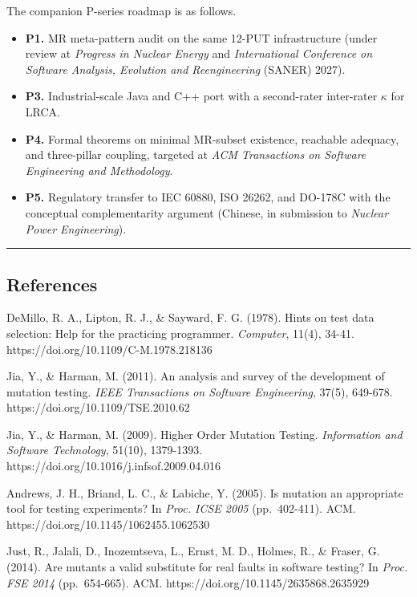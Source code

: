 \documentclass[review,12pt,authoryear]{elsarticle}
\providecommand{\tightlist}{\setlength{\itemsep}{0pt}\setlength{\parskip}{0pt}}
\begin{document}
The companion P-series roadmap is as follows.

\begin{itemize}
\tightlist
\item
  \textbf{P1.} MR meta-pattern audit on the same 12-PUT infrastructure
  (under review at \emph{Progress in Nuclear Energy} and
  \emph{International Conference on Software Analysis, Evolution and
  Reengineering} (SANER) 2027).
\item
  \textbf{P3.} Industrial-scale Java and C++ port with a second-rater
  inter-rater $\kappa$ for LRCA.
\item
  \textbf{P4.} Formal theorems on minimal MR-subset existence, reachable
  adequacy, and three-pillar coupling, targeted at \emph{ACM
  Transactions on Software Engineering and Methodology}.
\item
  \textbf{P5.} Regulatory transfer to IEC 60880, ISO 26262, and DO-178C
  with the conceptual complementarity argument (Chinese, in submission
  to \emph{Nuclear Power Engineering}).
\end{itemize}

\begin{center}\rule{0.5\linewidth}{0.5pt}\end{center}

\subsection{References}\label{references}

DeMillo, R. A., Lipton, R. J., \& Sayward, F. G. (1978). Hints on test
data selection: Help for the practicing programmer. \emph{Computer},
11(4), 34-41. https://doi.org/10.1109/C-M.1978.218136

Jia, Y., \& Harman, M. (2011). An analysis and survey of the development
of mutation testing. \emph{IEEE Transactions on Software Engineering},
37(5), 649-678. https://doi.org/10.1109/TSE.2010.62

Jia, Y., \& Harman, M. (2009). Higher Order Mutation Testing.
\emph{Information and Software Technology}, 51(10), 1379-1393.
https://doi.org/10.1016/j.infsof.2009.04.016

Andrews, J. H., Briand, L. C., \& Labiche, Y. (2005). Is mutation an
appropriate tool for testing experiments? In \emph{Proc. ICSE 2005}
(pp.~402-411). ACM. https://doi.org/10.1145/1062455.1062530

Just, R., Jalali, D., Inozemtseva, L., Ernst, M. D., Holmes, R., \&
Fraser, G. (2014). Are mutants a valid substitute for real faults in
software testing? In \emph{Proc. FSE 2014} (pp.~654-665). ACM.
https://doi.org/10.1145/2635868.2635929
\end{document}
